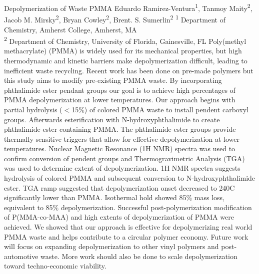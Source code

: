 \makeabstract
    {
    Depolymerization of Waste PMMA
    }
    {
    Eduardo Ramirez-Ventura\textsuperscript{1}, Tanmoy Maity\textsuperscript{2}, Jacob M. Mirsky\textsuperscript{2}, Bryan Cowley\textsuperscript{2}, Brent. S. Sumerlin\textsuperscript{2}
    }
    {
    \textsuperscript{1} Department of Chemistry, Amherst College, Amherst, MA\\
\textsuperscript{2} Department of Chemistry, University of Florida, Gainesville, FL
    }
    {
    Poly(methyl methacrylate) (PMMA) is widely used for its mechanical properties, but high thermodynamic and kinetic barriers make depolymerization difficult, leading to inefficient waste recycling. Recent work has been done on pre-made polymers but this study aims to modify pre-existing PMMA waste. By incorporating phthalimide ester pendant groups our goal is to achieve high percentages of PMMA depolymerization at lower temperatures.
    }
    {
    Our approach begins with partial hydrolysis (\ensuremath{<}15\%) of colored PMMA waste to install pendent carboxyl groups. Afterwards esterification with N-hydroxyphthalimide to create phthalimide-ester containing PMMA. The phthalimide-ester groups provide thermally sensitive triggers that allow for effective depolymerization at lower temperatures. Nuclear Magnetic Resonance (1H NMR) spectra was used to confirm conversion of pendent groups and Thermogravimetric Analysis (TGA) was used to determine extent of depolymerization.
    }
    {
    1H NMR spectra suggests hydrolysis of colored PMMA and subsequent conversion to N-hydroxyphthalimide ester. TGA ramp suggested that depolymerization onset decreased to 240{\textdegree}C significantly lower than PMMA. Isothermal hold showed 85\% mass loss, equivalent to 85\% depolymerization. Successful post-polymerization modification of P(MMA-co-MAA) and high extents of depolymerization of PMMA were achieved.
    }
    {
    We showed that our approach is effective for depolymerizing real world PMMA waste and helps contribute to a circular polymer economy. Future work will focus on expanding depolymerization to other vinyl polymers and post-automotive waste. More work should also be done to scale depolymerization toward techno-economic viability. 
    }

    \newpage
    